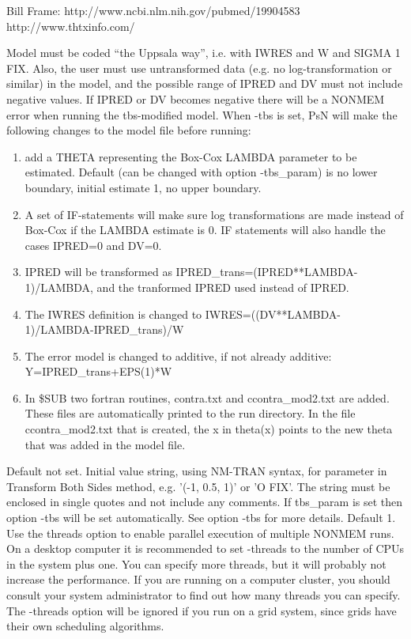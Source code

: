 \begin{optionlist}
Bill Frame: http://www.ncbi.nlm.nih.gov/pubmed/19904583
 http://www.thtxinfo.com/
 
 Model must be coded “the Uppsala way”, i.e. with IWRES and W and SIGMA 1 FIX. Also, the user must use untransformed data (e.g. no log-transformation or similar) in the model, and the possible range of IPRED and DV must not include negative values. If IPRED or DV becomes negative there will be a NONMEM error when running the tbs-modified model. 
 When -tbs is set, PsN will make the following changes to the model file before running:
\begin{enumerate}
	\item add a THETA representing the Box-Cox LAMBDA parameter to be estimated. Default (can be changed with option -tbs\_param) is no lower boundary, initial estimate 1, no upper boundary.
	\item A set of IF-statements will make sure log transformations are made instead of Box-Cox if the LAMBDA estimate is 0. IF statements will also handle the cases IPRED=0 and DV=0.
	\item IPRED will be transformed as 
 IPRED\_trans=(IPRED**LAMBDA-1)/LAMBDA, 
 and the tranformed  IPRED used instead of IPRED.  
	\item The IWRES definition is changed to 
 IWRES=((DV**LAMBDA-1)/LAMBDA-IPRED\_trans)/W
	\item The error model is changed to additive, if not already additive:
 Y=IPRED\_trans+EPS(1)*W
	\item In \$SUB two fortran routines, contra.txt and ccontra\_mod2.txt are added. These files are automatically printed to the run directory. In the file ccontra\_mod2.txt that is created, the x in theta(x) points to the new theta that was added in the model file.
\end{enumerate}
\nextopt
{}
Default not set. Initial value string, using NM-TRAN syntax, for parameter in Transform Both Sides method, e.g. '(-1, 0.5, 1)' or 'O FIX'. The string must be enclosed in single quotes and not include any comments. If tbs\_param is set then option -tbs will be set automatically. See option -tbs for more details. 
\nextopt
{}
Default 1. Use the threads option to enable parallel execution of multiple NONMEM runs. On a desktop computer it is recommended to set -threads to the number of CPUs in the system plus one. You can specify more threads, but it will probably not increase the performance. If you are running on a computer cluster, you should consult your system administrator to find out how many threads you can specify. The -threads option will be ignored if you run on a grid system, since grids have their own scheduling algorithms. 

\end{optionlist}
